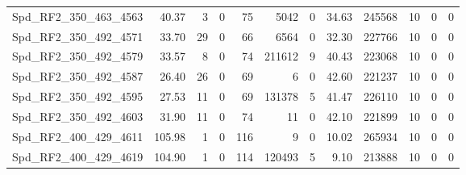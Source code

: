 \begin{longtable}[c]{@{}lrrrrrrrrrrr@{}}
Spd\_RF2\_350\_463\_4563      & 40.37                  & 3                       & 0                       & 75                     & 5042                    & 0                       & 34.63                   & 245568                   & 10                       & 0                        & 0                        \\
Spd\_RF2\_350\_492\_4571      & 33.70                  & 29                      & 0                       & 66                     & 6564                    & 0                       & 32.30                   & 227766                   & 10                       & 0                        & 0                        \\
Spd\_RF2\_350\_492\_4579      & 33.57                  & 8                       & 0                       & 74                     & 211612                  & 9                       & 40.43                   & 223068                   & 10                       & 0                        & 0                        \\
Spd\_RF2\_350\_492\_4587      & 26.40                  & 26                      & 0                       & 69                     & 6                       & 0                       & 42.60                   & 221237                   & 10                       & 0                        & 0                        \\
Spd\_RF2\_350\_492\_4595      & 27.53                  & 11                      & 0                       & 69                     & 131378                  & 5                       & 41.47                   & 226110                   & 10                       & 0                        & 0                        \\
Spd\_RF2\_350\_492\_4603      & 31.90                  & 11                      & 0                       & 74                     & 11                      & 0                       & 42.10                   & 221899                   & 10                       & 0                        & 0                        \\
Spd\_RF2\_400\_429\_4611      & 105.98                 & 1                       & 0                       & 116                    & 9                       & 0                       & 10.02                   & 265934                   & 10                       & 0                        & 0                        \\
Spd\_RF2\_400\_429\_4619      & 104.90                 & 1                       & 0                       & 114                    & 120493                  & 5                       & 9.10                    & 213888                   & 10                       & 0                        & 0                        \\

\end{longtable}
